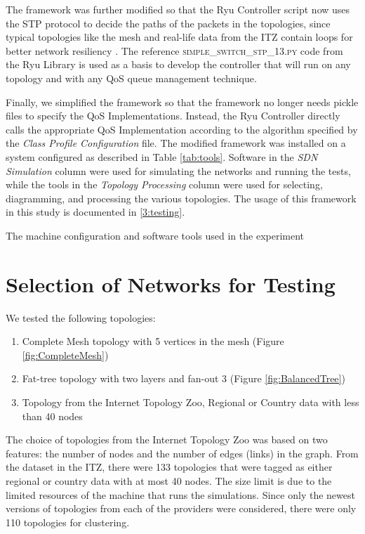 The framework was further modified so that the Ryu Controller script now uses the STP protocol to decide the paths of the packets in the topologies, since typical topologies like the mesh and real-life data from the ITZ contain loops for better network resiliency \cite{smith_shortest_2011}. The reference \textsc{simple\_switch\_stp\_13.py} code from the Ryu Library is used as a basis to develop the controller that will run on any topology and with any QoS queue management technique.

Finally, we simplified the framework so that the framework no longer needs pickle files to specify the QoS Implementations. Instead, the Ryu Controller directly calls the appropriate QoS Implementation according to the algorithm specified by the \textit{Class Profile Configuration} file. The modified framework was installed on a system configured as described in Table \ref{tab:tools}. Software in the \textit{SDN Simulation} column were used for simulating the networks and running the tests, while the tools in the \textit{Topology Processing} column were used for selecting, diagramming, and processing the various topologies. The usage of this framework in this study is documented in \ref{3:testing}.

\begin{table}[htbp]
    \centering
    \caption{The machine configuration and software tools used in the experiment}
    
    \label{tab:tools}
\end{table}

\section{Selection of Networks for Testing} \label{sec:selection}
We tested the following topologies:
\begin{enumerate}
    \item Complete Mesh topology with 5 vertices in the mesh (Figure \ref{fig:CompleteMesh})
    \item Fat-tree topology with two layers and fan-out 3 (Figure \ref{fig:BalancedTree})
    \item Topology from the Internet Topology Zoo, Regional or Country data with less than 40 nodes
\end{enumerate}

The choice of topologies from the Internet Topology Zoo was based on two features: the number of nodes and the number of edges (links) in the graph. From the dataset in the ITZ, there were 133 topologies that were tagged as either regional or country data with at most 40 nodes. The size limit is due to the limited resources of the machine that runs the simulations. Since only the newest versions of topologies from each of the providers were considered, there were only 110 topologies for clustering. 

